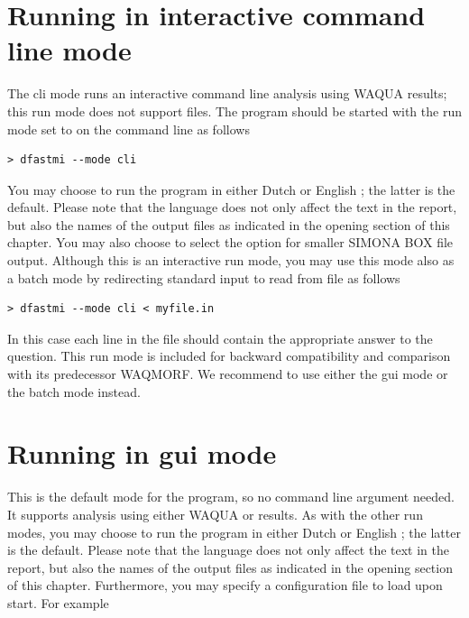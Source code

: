 \section{Running in interactive command line mode}

The cli mode runs an interactive command line analysis using WAQUA results; this run mode does not support \dflowfm files.
The program should be started with the run mode set to  on the command line as follows

\begin{Verbatim}
> dfastmi --mode cli
\end{Verbatim}

You may choose to run the program in either Dutch  or English ; the latter is the default.
Please note that the language does not only affect the text in the report, but also the names of the output files as indicated in the opening section of this chapter.
You may also choose to select the  option for smaller SIMONA BOX file output.
Although this is an interactive run mode, you may use this mode also as a batch mode by redirecting standard input to read from file as follows

\begin{Verbatim}
> dfastmi --mode cli < myfile.in
\end{Verbatim}

In this case each line in the file  should contain the appropriate answer to the question.
This run mode is included for backward compatibility and comparison with its predecessor WAQMORF.
We recommend to use either the gui mode or the batch mode instead.

\section{Running in gui mode}

This is the default mode for the program, so no command line argument needed.
It supports analysis using either WAQUA or \dflowfm results.
As with the other run modes, you may choose to run the program in either Dutch  or English ; the latter is the default.
Please note that the language does not only affect the text in the report, but also the names of the output files as indicated in the opening section of this chapter.
Furthermore, you may specify a configuration file to load upon start.
For example

